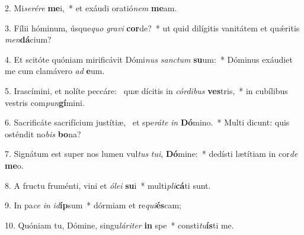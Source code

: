 2. Mi\textit{se}\textit{ré}\textit{re} \textbf{me}i,~*  et exáudi oratió\textit{nem} \textbf{me}am.\

3. Fílii hóminum, úsque\textit{quo} \textit{gra}\textit{vi} \textbf{cor}de?~*  ut quid dilígitis vanitátem et quǽritis \textit{men}\textbf{dá}cium?\

4. Et scitóte quóniam mirificávit Dómi\textit{nus} \textit{sanc}\textit{tum} \textbf{su}um:~*  Dóminus exáudiet me cum clamávero \textit{ad} \textbf{e}um.\

5. Irascímini, et nolíte peccáre: \dag\  quæ dícitis in \textit{cór}\textit{di}\textit{bus} \textbf{ves}tris,~*  in cubílibus vestris com\textit{pun}\textbf{gí}mini.\

6. Sacrificáte sacrifícium justítiæ, \dag\  et spe\textit{rá}\textit{te} \textit{in} \textbf{Dó}mino.~*  Multi dicunt: quis osténdit no\textit{bis} \textbf{bo}na?\

7. Signátum est super nos lumen vul\textit{tus} \textit{tu}\textit{i}, \textbf{Dó}mine:~*  dedísti lætítiam in cor\textit{de} \textbf{me}o.\

8. A fructu fruménti, vini et \textit{ó}\textit{le}\textit{i} \textbf{su}i~*  multi\textit{pli}\textbf{cá}ti sunt.\

9. In pa\textit{ce} \textit{in} \textit{id}\textbf{íp}sum~*  dórmiam et re\textit{qui}\textbf{és}cam;\

10. Quóniam tu, Dómine, singu\textit{lá}\textit{ri}\textit{ter} \textbf{in} spe~*  consti\textit{tu}\textbf{ís}ti me.\

